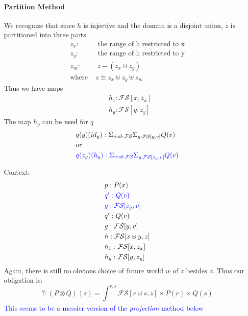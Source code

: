 \documentclass{article}
\newcommand{\blue}[1]{\textcolor{blue}{#1}}
\begin{document}
\paragraph{Partition Method}
We recognize that since $h$ is injective and the domain is a disjoint union, $z$ is partitioned into three parts
\begin{align*}
    z_x :& \textrm{ the range of h restricted to x}\\
    z_y :& \textrm{ the range of h restricted to y}\\
    z_m :& \; z - (z_x \uplus z_y)\\
    \textrm{where } & z \cong z_x \uplus z_y \uplus z_m
\end{align*}
Thus we have maps
\begin{align*}
    &h_x: \mathcal{FS}[x , z_x]\\
    &h_y: \mathcal{FS}[y , z_y]
\end{align*}
The map $h_y$ can be used for $q$
\begin{align*}
        &q(y)(id_y) : \Sigma_{v : ob \;\mathcal{FS}}\Sigma_{g : \mathcal{FS}[ y , v ]}Q(v)\\
        &\textrm{or}\\
        &\blue{q(z_y)(h_y) : \Sigma_{v : ob \;\mathcal{FS}}\Sigma_{g : \mathcal{FS}[ z_y , v ]}Q(v)}
\end{align*}

Context:
\begin{align*}
    &p : P(x)\\
    &\blue{q' : Q(v)}\\
    &\blue{g : \mathcal{FS}[ z_y , v ]}\\
    &q' : Q(v)\\
    &g : \mathcal{FS}[ y , v ]\\
    &h : \mathcal{FS}[x\uplus y , z]\\
    &h_x: \mathcal{FS}[x , z_x]\\
    &h_y: \mathcal{FS}[y , z_y]
\end{align*}
Again, there is still no obvious choice of future world $w$ of $z$ besides $z$.
Thus our obligation is:
\[
    ? : (P \otimes Q)(z) = \int_{}^{r,s} \mathcal{FS}[r \uplus s,z ] 
    \times P(r) \times Q(s)
\]
\blue{This seems to be a messier version of the \textit{projection} method below}
\end{document}
